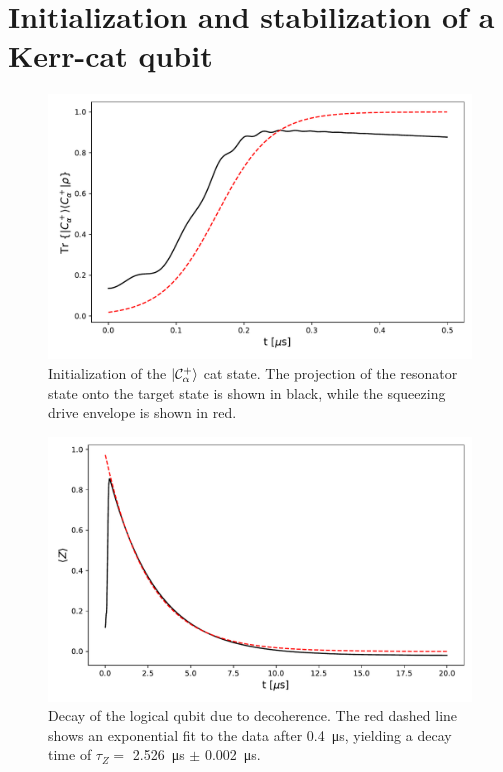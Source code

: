 \section{\label{sec:init} Initialization and stabilization of a Kerr-cat qubit}

\begin{figure}[t]
    \centering
    \includegraphics[width=\columnwidth]{figures/initialization.pdf}
    \caption{Initialization of the $\ket{\mathcal{C}_\alpha^+}$ cat state. The projection of the resonator state onto the target state is shown in black, while the squeezing drive envelope is shown in red.}
    \label{fig:initialization}
\end{figure}

\begin{figure}[t]
    \centering
    \includegraphics[width=\columnwidth]{figures/decay.pdf}
    \caption{Decay of the logical qubit due to decoherence. The red dashed line shows an exponential fit to the data after \SI{0.4}{\micro\s}, yielding a decay time of $\tau_Z =$ \SI{2.526}{\micro\s} $\pm$ \SI{0.002}{\micro\s}.}
    \label{fig:decay}
\end{figure}

